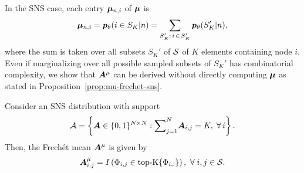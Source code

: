 In the SNS case, each entry $\boldsymbol{\mu}_{n,i}$ of $\boldsymbol{\mu}$ is  
\begin{equation}
    \boldsymbol{\mu}_{n,i} = {{\bm{p}}_\theta}(i \in S_K | n)=\sum_{S_K':\, i\, \in\, S_K'} {{\bm{p}}_\theta}(S_K' | n),    
\end{equation}
where the sum is taken over all subsets $S_K'$ of $\mathcal{S}$ of $K$ elements containing node $i$.
Even if marginalizing over all possible sampled subsets of $S_K'$ has combinatorial complexity, we show that ${\bm{A}}^\mu$ can be derived without directly computing $\boldsymbol{\mu}$ as stated in Proposition~\ref{prop:mu-frechet-sns}.
\begin{proposition}\label{prop:mu-frechet-sns}
Consider an SNS distribution with support 
\begin{equation}\label{eq:directed-knn-set}
{\mathcal{A}} = \left\{{\bm{A}} \in\{0,1\}^{N\times N} : \small{\sum}_{j=1}^N {\bm{A}}_{i,j} = K, \;\forall\,i \right\}.
\end{equation}
Then, the Frechét mean ${\bm{A}}^\mu$ is given by
\begin{equation}
    \gsofr_{i,j} = I\left(\Phi_{i,j} \in \small{\topk} \{\Phi_{i,:}\}\right),\ \forall\;i,j\in\sensorset.
\end{equation}
\end{proposition}
